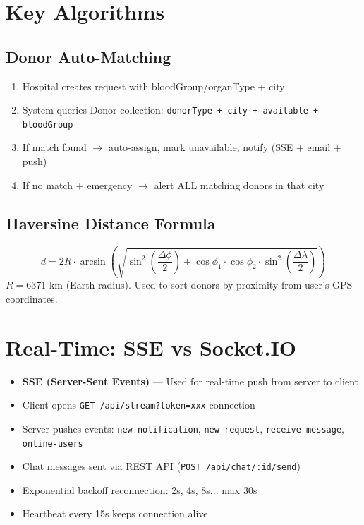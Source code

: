 \documentclass[10pt,a4paper]{article}
\begin{document}
\section{Key Algorithms}

\subsection{Donor Auto-Matching}
\begin{enumerate}
    \item Hospital creates request with bloodGroup/organType + city
    \item System queries Donor collection: \texttt{donorType + city + available + bloodGroup}
    \item If match found $\rightarrow$ auto-assign, mark unavailable, notify (SSE + email + push)
    \item If no match + emergency $\rightarrow$ alert ALL matching donors in that city
\end{enumerate}

\subsection{Haversine Distance Formula}
\[
d = 2R \cdot \arcsin\left(\sqrt{\sin^2\left(\frac{\Delta\phi}{2}\right) + \cos\phi_1 \cdot \cos\phi_2 \cdot \sin^2\left(\frac{\Delta\lambda}{2}\right)}\right)
\]
$R = 6371$ km (Earth radius). Used to sort donors by proximity from user's GPS coordinates.

\section{Real-Time: SSE vs Socket.IO}

\begin{itemize}
    \item \textbf{SSE (Server-Sent Events)} --- Used for real-time push from server to client
    \item Client opens \texttt{GET /api/stream?token=xxx} connection
    \item Server pushes events: \texttt{new-notification}, \texttt{new-request}, \texttt{receive-message}, \texttt{online-users}
    \item Chat messages sent via REST API (\texttt{POST /api/chat/:id/send})
    \item Exponential backoff reconnection: 2s, 4s, 8s... max 30s
    \item Heartbeat every 15s keeps connection alive
\end{itemize}
\end{document}
